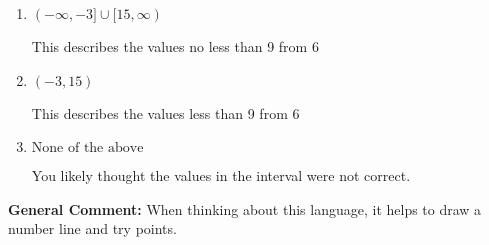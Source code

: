 \documentclass{extbook}[14pt]
\begin{document}
\begin{enumerate}
{\begin{enumerate}[label=\Alph*.]
This describes the values no more than 9 from 6
\item \( (-\infty, -3] \cup [15, \infty) \)

This describes the values no less than 9 from 6
\item \( (-3, 15) \)

This describes the values less than 9 from 6
\item \( \text{None of the above} \)

You likely thought the values in the interval were not correct.
\end{enumerate}

\textbf{General Comment:} When thinking about this language, it helps to draw a number line and try points.
}
\end{enumerate}
\end{document}
